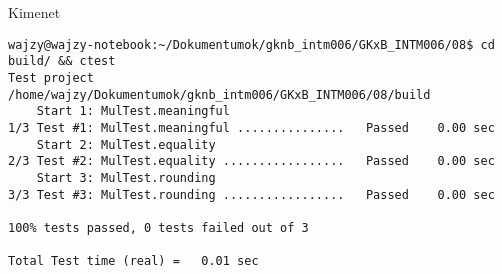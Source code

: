 \begin{frame}[fragile]
  \begin{block}{Kimenet}
    \scriptsize
    \vspace{-.5cm}
    \begin{verbatim}
wajzy@wajzy-notebook:~/Dokumentumok/gknb_intm006/GKxB_INTM006/08$ cd build/ && ctest
Test project /home/wajzy/Dokumentumok/gknb_intm006/GKxB_INTM006/08/build
    Start 1: MulTest.meaningful
1/3 Test #1: MulTest.meaningful ...............   Passed    0.00 sec
    Start 2: MulTest.equality
2/3 Test #2: MulTest.equality .................   Passed    0.00 sec
    Start 3: MulTest.rounding
3/3 Test #3: MulTest.rounding .................   Passed    0.00 sec

100% tests passed, 0 tests failed out of 3

Total Test time (real) =   0.01 sec
\end{verbatim}
    \vspace{-.4cm}
  \end{block}
\end{frame}
